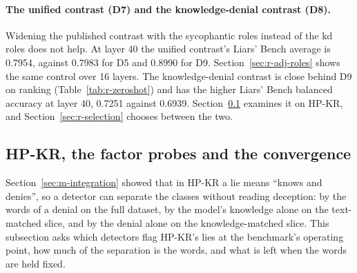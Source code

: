 \paragraph{The unified contrast (D7) and the knowledge-denial contrast (D8).} Widening the published contrast with the sycophantic roles instead of the kd roles does not help. %
At layer 40 the unified contrast's Liars' Bench average is 0.7954, against 0.7983 for D5 and 0.8990 for D9. %
Section~\ref{sec:r-adj-roles} shows the same control over 16 layers.
The knowledge-denial contrast is close behind D9 on ranking (Table~\ref{tab:r-zeroshot}) and has the higher Liars' Bench balanced accuracy at layer 40, 0.7251 against 0.6939. %
Section~\ref{sec:r-hpkr} examines it on HP-KR, and Section~\ref{sec:r-selection} chooses between the two.

\subsection{HP-KR, the factor probes and the convergence}
\label{sec:r-hpkr}

Section~\ref{sec:m-integration} showed that in HP-KR a lie means ``knows and denies'', so a detector can separate the classes without reading deception: by the words of a denial on the full dataset, by the model's knowledge alone on the text-matched slice, and by the denial alone on the knowledge-matched slice. %
This subsection asks which detectors flag HP-KR's lies at the benchmark's operating point, how much of the separation is the words, and what is left when the words are held fixed.

